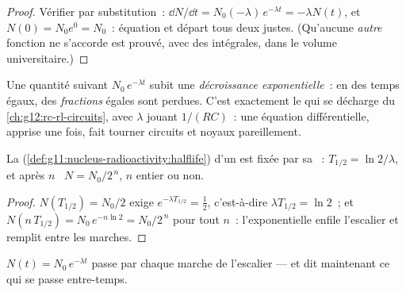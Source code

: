 \begin{proof}
Vérifier par substitution~:
$\dd N/\dd t = N_0(-\lambda)\,e^{-\lambda t} = -\lambda N(t)$, et
$N(0) = N_0 e^0 = N_0$~: équation et départ tous deux justes. (Qu'aucune
\emph{autre} fonction ne s'accorde est prouvé, avec des intégrales,
dans le volume universitaire.)
\end{proof}

\begin{definition}\label{def:g12:radioactive-decay:exponential}
Une quantité suivant $N_0\,e^{-\lambda t}$ subit une
\emph{décroissance exponentielle}~:
en des temps égaux, des \emph{fractions} égales sont perdues. C'est
exactement le  qui se décharge du
\cref{ch:g12:rc-rl-circuits}, avec $\lambda$ jouant $1/(RC)$~: une
équation différentielle, apprise une fois, fait tourner circuits et
noyaux pareillement.
\end{definition}

\begin{proposition}\label{prop:g12:radioactive-decay:halflife}
La 
(\cref{def:g11:nucleus-radioactivity:halflife}) d'un
 est fixée par sa
~:
$T_{1/2} = \ln 2/\lambda$, et après $n$~ $N = N_0/2^{\,n}$,
$n$ entier ou non.
\end{proposition}

\begin{proof}
$N(T_{1/2}) = N_0/2$ exige $e^{-\lambda T_{1/2}} = \tfrac12$,
c'est-à-dire $\lambda T_{1/2} = \ln 2$~; et
$N(n\,T_{1/2}) = N_0\,e^{-n\ln 2} = N_0/2^{\,n}$ pour tout $n$~:
l'exponentielle enfile l'escalier et remplit entre les marches.
\end{proof}

\begin{omfigure}

{\small $N(t) = N_0\,e^{-\lambda t}$ passe par chaque marche de
l'escalier --- et dit maintenant ce qui se passe entre-temps.}
\end{omfigure}

